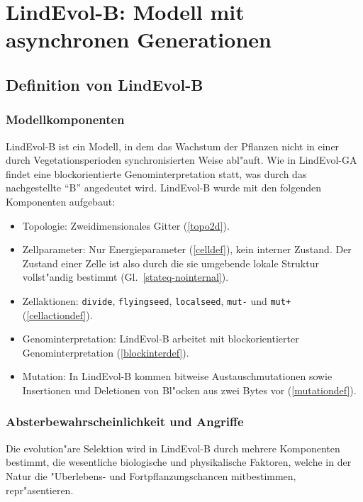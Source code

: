 \chapter[LindEvol-B]{LindEvol-B: Modell mit asynchronen Generationen}
\label{lindevol-2}


\section{Definition von LindEvol-B}
\label{lnd2-def}

\subsection{Modellkomponenten}

LindEvol-B ist ein Modell, in dem das Wachstum der Pflanzen nicht in einer durch Vegetationsperioden
synchronisierten Weise abl"auft. Wie in LindEvol-GA findet eine blockorientierte Genominterpretation
statt, was durch das nachgestellte "`B"' angedeutet wird. LindEvol-B wurde mit den folgenden Komponenten aufgebaut:

\begin{itemize}
\item Topologie: Zweidimensionales Gitter (\protect\ref{topo2d}).
\item Zellparameter: Nur Energieparameter (\protect\ref{celldef}), kein interner Zustand.
    Der Zustand einer Zelle ist also durch die sie umgebende lokale Struktur vollst"andig bestimmt
    (Gl.\ \ref{stateq-nointernal}).
\item Zellaktionen: \verb|divide|, \verb|flyingseed|, \verb|localseed|,
    \verb|mut-| und \verb|mut+| (\protect\ref{cellactiondef}).
\item Genominterpretation: LindEvol-B arbeitet mit blockorientierter
    Genominterpretation (\protect\ref{blockinterdef}).
\item Mutation: In LindEvol-B kommen bitweise Austauschmutationen sowie
    Insertionen und Deletionen von Bl"ocken aus zwei Bytes vor (\protect\ref{mutationdef}).
\end{itemize}


\subsection{Absterbewahrscheinlichkeit und Angriffe}

Die evolution"are Selektion wird in LindEvol-B durch mehrere Komponenten
bestimmt, die wesentliche biologische und physikalische Faktoren, welche
in der Natur die "Uberlebens- und Fortpflanzungschancen mitbestimmen,
repr"asentieren.

